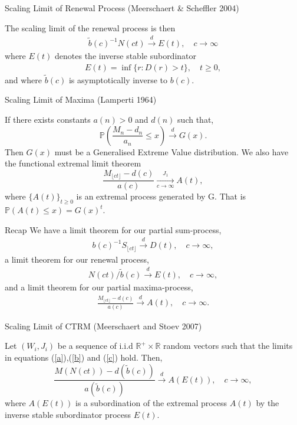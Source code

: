 \documentclass{beamer}
\newcommand{\PP}{\mathbb{P}}
\newcommand{\cd}{\overset{d}{\longrightarrow}}
\newcommand{\Floor}[1]{{\lfloor {#1} \rfloor}}
\begin{document}
\begin{frame}{Scaling Limit of Renewal Process}
(Meerschaert \& Scheffler 2004) 

The scaling limit of the renewal process is then
\begin{align*}
\tilde b(c)^{-1}N(ct) \cd E(t), \quad c \to \infty
\end{align*}
where $E(t)$ denotes the inverse stable subordinator
\begin{align*}
E(t) = \inf\{r: D(r) > t\}, \quad t \ge 0,
\end{align*}
and where $\tilde b(c)$ is asymptotically inverse to $b(c)$.
\end{frame}

\begin{frame}{Scaling Limit of Maxima}
(Lamperti 1964)

If there exists constants $a(n)>0$ and $d(n)$ such that,
\[
	\PP\left(\frac{M_n -d_n}{a_n} \leq x \right) \cd G(x) .
\]
Then $G(x)$ must be a Generalised Extreme Value distribution. We also have the functional extremal limit theorem 
\[
\frac{M_\Floor{ct}-d(c)}{a(c)} \xrightarrow[c\to \infty]{J_1} A(t),
\]
where $\{A(t)\}_{t\geq0}$ is an extremal process generated by G. That is $\PP(A(t)\leq x)=G(x)^t$.
\end{frame}

\begin{frame}{Recap}
We have a limit theorem for our partial sum-process,
\begin{align}\label{a}
	b(c)^{-1}S_\Floor{ct} \cd D(t), \quad c \to \infty,
\end{align}
a limit theorem for our renewal process,
\begin{align}\label{b}
	N(ct) / \tilde b(c) \cd E(t), \quad c \to \infty,
\end{align}
and a limit theorem for our partial maxima-process,
\begin{align}\label{c}
	\frac{M_\Floor{ct}-d(c)}{a(c)} \cd A(t), \quad c \to \infty.
\end{align}
\end{frame}

\begin{frame}{Scaling Limit of CTRM}
(Meerschaert and Stoev 2007)

Let $(W_i,J_i)$ be a sequence of i.i.d $\mathbb{R}^+\times\mathbb{R}$ random vectors such that the limits in equations (\ref{a}),(\ref{b}) and (\ref{c}) hold. Then,
        \[
            \frac{M(N(ct))-d(\tilde{b}(c))}{a(\tilde{b}(c))} \cd A(E(t)), \quad c\to\infty,
        \]
where $A(E(t))$ is a subordination of the extremal process $A(t)$ by the inverse stable subordinator process $E(t)$.\\

\end{frame}
\end{document}
